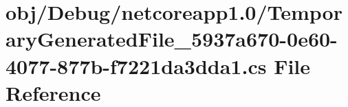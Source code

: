\hypertarget{_debug_2netcoreapp1_80_2_temporary_generated_file__5937a670-0e60-4077-877b-f7221da3dda1_8cs}{}\section{obj/\+Debug/netcoreapp1.0/\+Temporary\+Generated\+File\+\_\+5937a670-\/0e60-\/4077-\/877b-\/f7221da3dda1.cs File Reference}
\label{_debug_2netcoreapp1_80_2_temporary_generated_file__5937a670-0e60-4077-877b-f7221da3dda1_8cs}
